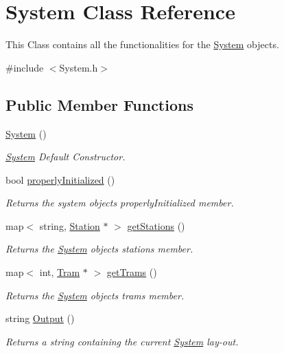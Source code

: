 \hypertarget{classSystem}{}\section{System Class Reference}
\label{classSystem}


This Class contains all the functionalities for the \hyperlink{classSystem}{System} objects.  




{\ttfamily \#include $<$System.\+h$>$}

\subsection*{Public Member Functions}
\begin{DoxyCompactItemize}
\item 
\hyperlink{classSystem_ae317936c9bcf1374d61745572e0f2f8a}{System} ()
\begin{DoxyCompactList}\small\item\em \hyperlink{classSystem}{System} Default Constructor. \end{DoxyCompactList}\item 
bool \hyperlink{classSystem_a8532240d722aafc7084ca6047909c8da}{properly\+Initialized} ()
\begin{DoxyCompactList}\small\item\em Returns the system object\textquotesingle{}s properly\+Initialized member. \end{DoxyCompactList}\item 
map$<$ string, \hyperlink{classStation}{Station} $\ast$ $>$ \hyperlink{classSystem_a30d05f13a13f95f580a0e705142fa3ea}{get\+Stations} ()
\begin{DoxyCompactList}\small\item\em Returns the \hyperlink{classSystem}{System} object\textquotesingle{}s stations member. \end{DoxyCompactList}\item 
map$<$ int, \hyperlink{classTram}{Tram} $\ast$ $>$ \hyperlink{classSystem_a7ef5389572f830ddaa61052ce09f48de}{get\+Trams} ()
\begin{DoxyCompactList}\small\item\em Returns the \hyperlink{classSystem}{System} object\textquotesingle{}s trams member. \end{DoxyCompactList}\item 
string \hyperlink{classSystem_afd117849fbf4d7d8dc0f54988589c249}{Output} ()
\begin{DoxyCompactList}\small\item\em Returns a string containing the current \hyperlink{classSystem}{System} lay-\/out. \end{DoxyCompactList}\item 

\end{DoxyCompactItemize}
